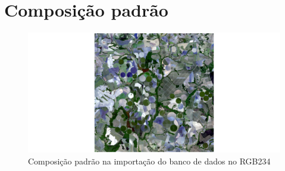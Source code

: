 \documentclass[a4paper]{article}
\begin{document}
	
	\newpage
	\tableofcontents
	\listoffigures
	\newpage
	\section{Composição padrão}
	\begin{figure}[H]
		\hspace{-7.7cm}\includegraphics[width=1.9\linewidth]{../images/default}
		\caption{Composição padrão na importação do banco de dados no RGB234}
	\end{figure}
	\newpage
\end{document}
